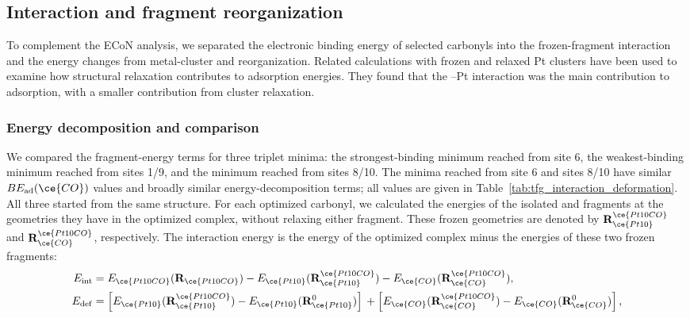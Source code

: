 \subsection{Interaction and fragment reorganization}
\label{subsec:interaction_fragment_reorganization}
To complement the ECoN analysis, we separated the electronic
binding energy of selected carbonyls into the frozen-fragment interaction and
the energy changes from metal-cluster and  reorganization.
Related calculations with frozen and relaxed Pt clusters have been
used to examine how structural relaxation contributes to 
adsorption energies\cite{gasper:2017}. They found that the
--Pt interaction was the main contribution to adsorption,
with a smaller contribution from cluster relaxation.

\subsubsection{Energy decomposition and  comparison}

We compared the fragment-energy terms for three triplet
 minima: the strongest-binding minimum reached from site 6,
the weakest-binding minimum reached from sites 1/9, and the minimum reached
from sites 8/10. The minima reached from site 6 and sites 8/10 have similar
$BE_{\rm ad}(\ce{CO})$ values and broadly similar energy-decomposition terms;
all values are given in Table~\ref{tab:tfg_interaction_deformation}. All three
started from the same  structure.
For each
optimized carbonyl,
we calculated the energies of the isolated  and 
fragments at the geometries they have in the optimized complex, without
relaxing either fragment. These frozen geometries are denoted by
\(\mathbf R_{\ce{Pt10}}^{\ce{Pt10CO}}\) and
\(\mathbf R_{\ce{CO}}^{\ce{Pt10CO}}\), respectively. The interaction energy is the energy
of the optimized complex minus the energies of these two frozen fragments:
\begin{align}
E_{\mathrm{int}} &=
E_{\ce{Pt10CO}}(\mathbf R_{\ce{Pt10CO}})
-E_{\ce{Pt10}}(\mathbf R_{\ce{Pt10}}^{\ce{Pt10CO}})
-E_{\ce{CO}}(\mathbf R_{\ce{CO}}^{\ce{Pt10CO}}),\\
E_{\mathrm{def}} &=
\left[
E_{\ce{Pt10}}(\mathbf R_{\ce{Pt10}}^{\ce{Pt10CO}})
-E_{\ce{Pt10}}(\mathbf R_{\ce{Pt10}}^{0})
\right]
{}+
\left[
E_{\ce{CO}}(\mathbf R_{\ce{CO}}^{\ce{Pt10CO}})
-E_{\ce{CO}}(\mathbf R_{\ce{CO}}^{0})
\right],
\label{eq:tfg_deformation}
\end{align}

